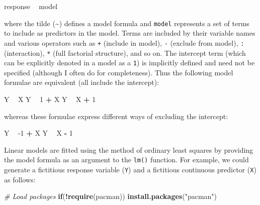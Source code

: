 \documentclass[
]{book}
\newenvironment{Shaded}{\begin{snugshade}}{\end{snugshade}}
\newcommand{\CommentTok}[1]{\textcolor[rgb]{0.56,0.35,0.01}{\textit{#1}}}
\newcommand{\ControlFlowTok}[1]{\textcolor[rgb]{0.13,0.29,0.53}{\textbf{#1}}}
\newcommand{\DecValTok}[1]{\textcolor[rgb]{0.00,0.00,0.81}{#1}}
\newcommand{\KeywordTok}[1]{\textcolor[rgb]{0.13,0.29,0.53}{\textbf{#1}}}
\newcommand{\NormalTok}[1]{#1}
\newcommand{\OperatorTok}[1]{\textcolor[rgb]{0.81,0.36,0.00}{\textbf{#1}}}
\newcommand{\StringTok}[1]{\textcolor[rgb]{0.31,0.60,0.02}{#1}}
\begin{document}
\begin{Shaded}
\begin{Highlighting}[]
\NormalTok{response }\OperatorTok{~}\StringTok{ }\NormalTok{model}
\end{Highlighting}
\end{Shaded}

where the tilde (\textasciitilde) defines a model formula and \texttt{model} represents a set of terms to include as predictors in the model. Terms are included by their variable names and various operators such as \texttt{+} (include in model), \texttt{-} (exclude from model), \texttt{:} (interaction), \texttt{*} (full factorial structure), and so on. The intercept term (which can be explicitly denoted in a model as a \texttt{1}) is implicitly defined and need not be specified (although I often do for completeness). Thus the following model formulae are equivalent (all include the intercept):

\begin{Shaded}
\begin{Highlighting}[]
\NormalTok{Y }\OperatorTok{~}\StringTok{ }\NormalTok{X}
\NormalTok{Y }\OperatorTok{~}\StringTok{ }\DecValTok{1} \OperatorTok{+}\StringTok{ }\NormalTok{X}
\NormalTok{Y }\OperatorTok{~}\StringTok{ }\NormalTok{X }\OperatorTok{+}\StringTok{ }\DecValTok{1}
\end{Highlighting}
\end{Shaded}

whereas these formulae express different ways of excluding the intercept:

\begin{Shaded}
\begin{Highlighting}[]
\NormalTok{Y }\OperatorTok{~}\StringTok{ }\DecValTok{-1} \OperatorTok{+}\StringTok{ }\NormalTok{X}
\NormalTok{Y }\OperatorTok{~}\StringTok{ }\NormalTok{X }\OperatorTok{-}\StringTok{ }\DecValTok{1}
\end{Highlighting}
\end{Shaded}

Linear models are fitted using the method of ordinary least squares by providing the model formula as an argument to the \texttt{lm()} function. For example, we could generate a fictitious response variable (\texttt{Y}) and a fictitious continuous predictor (\texttt{X}) as follows:

\begin{Shaded}
\begin{Highlighting}[]
\CommentTok{# Load packages}
\ControlFlowTok{if}\NormalTok{(}\OperatorTok{!}\KeywordTok{require}\NormalTok{(pacman)) }\KeywordTok{install.packages}\NormalTok{(}\StringTok{"pacman"}\NormalTok{)}
\end{Highlighting}
\end{Shaded}
\end{document}

